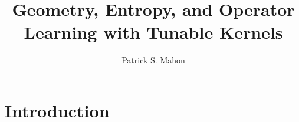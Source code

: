 \documentclass{article}
\begin{document}
\title{Geometry, Entropy, and Operator Learning with Tunable Kernels}
\author{Patrick S. Mahon}
\maketitle



\tableofcontents


\section{Introduction}






\end{document}
